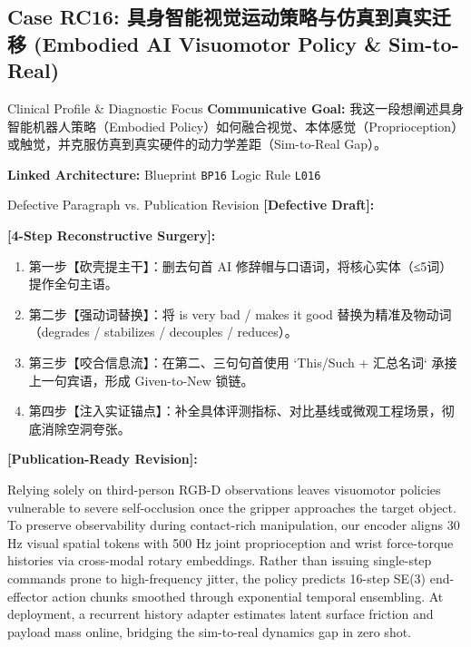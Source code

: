 \subsection{Case RC16: 具身智能视觉运动策略与仿真到真实迁移 (Embodied AI Visuomotor Policy \& Sim-to-Real)}\label{case:RC16}
\begin{ConceptBox}{Clinical Profile \& Diagnostic Focus}
\textbf{Communicative Goal:} 我这一段想阐述具身智能机器人策略（Embodied Policy）如何融合视觉、本体感觉（Proprioception）或触觉，并克服仿真到真实硬件的动力学差距（Sim-to-Real Gap）。\par
\textbf{Linked Architecture:} Blueprint \texttt{BP16} \enspace\textbar\enspace Logic Rule \texttt{L016}
\end{ConceptBox}
\begin{ExampleBox}{Defective Paragraph vs. Publication Revision}
\textbf{\color{TargetHighlight}[Defective Draft]:}\par
{}\par\vspace{6pt}
\textbf{\color{AcadForest}[4-Step Reconstructive Surgery]:}
\begin{enumerate}[label=\textbf{\color{AcadNavy}Step \arabic*:}, leftmargin=2em]
  \item 第一步【砍壳提主干】：删去句首 AI 修辞帽与口语词，将核心实体（≤5词）提作全句主语。
  \item 第二步【强动词替换】：将 is very bad / makes it good 替换为精准及物动词（degrades / stabilizes / decouples / reduces）。
  \item 第三步【咬合信息流】：在第二、三句句首使用 `This/Such + 汇总名词` 承接上一句宾语，形成 Given-to-New 锁链。
  \item 第四步【注入实证锚点】：补全具体评测指标、对比基线或微观工程场景，彻底消除空洞夸张。
\end{enumerate}\vspace{4pt}
\textbf{\color{AcadNavy}[Publication-Ready Revision]:}\par
Relying solely on third-person RGB-D observations leaves visuomotor policies vulnerable to severe self-occlusion once the gripper approaches the target object. To preserve observability during contact-rich manipulation, our encoder aligns 30 Hz visual spatial tokens with 500 Hz joint proprioception and wrist force-torque histories via cross-modal rotary embeddings. Rather than issuing single-step commands prone to high-frequency jitter, the policy predicts 16-step SE(3) end-effector action chunks smoothed through exponential temporal ensembling. At deployment, a recurrent history adapter estimates latent surface friction and payload mass online, bridging the sim-to-real dynamics gap in zero shot.
\end{ExampleBox}
